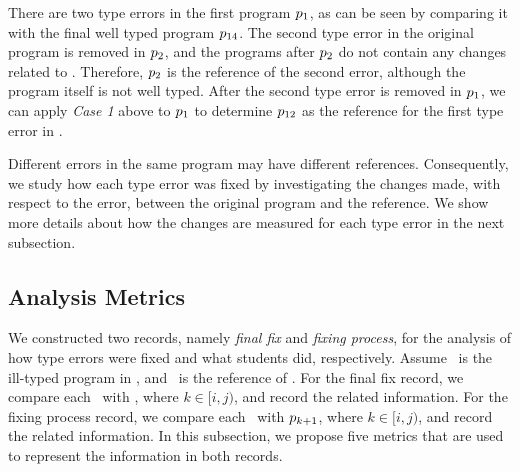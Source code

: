 \documentclass[12pt]{report}	%
\begin{document}
There are two type errors in the first program
$p\textsubscript{1}$, as can be seen by comparing it
with the final 
well typed program $p\textsubscript{14}$.
%
%
%
The second type error in the original program is removed in $p\textsubscript{2}$,
and the programs after $p\textsubscript{2}$ do not contain any changes 
related to .
Therefore, $p\textsubscript{2}$ is the reference of the second error,
although the program itself is not well typed.
%
%
After the second type error is removed in 
$p\textsubscript{1}$, we can apply \textit{Case 1} above
to $p\textsubscript{1}$ to determine $p\textsubscript{12}$
as the reference 
for the first type
error in .

Different errors in the same program may have different references.
Consequently, we study how each type error was fixed by investigating
the changes made, with respect to the error, between the original program
and the reference. We show more details about how the changes are measured
for each type error in the next subsection.

\subsection{Analysis Metrics}
\label{sec:subject:metric}

We constructed two records,
namely \emph{final fix} and \emph{fixing process},
for the analysis of how type errors were fixed and what students did, respectively.
Assume \pgi\ is the ill-typed program in \seqij, and \pgj\
is the reference of \pgi.
For the final fix record, we compare each \pgk\ with \pgj, where $k \in [i,j)$, 
and record the related information.
For the fixing process record, we compare each \pgk\ with $p_{k+1}$,
where $k \in [i,j)$, and record the related information.
In this subsection, we propose five metrics that
are used to represent the information in both records.
\end{document}
